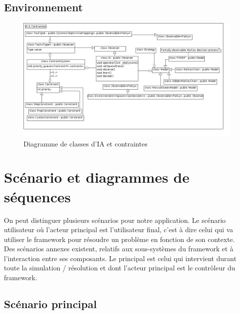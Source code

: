 \newpage
\subsection{Environnement}
\begin{figure}[!h]\centering
   \includegraphics[angle=90, scale=0.5]{images/c_ia_contraintes.png}
   \caption{\label{c_ia_contraintes} Diagramme de classes d'IA et contraintes}
\end{figure}

%
\newpage
\section{Scénario et diagrammes de séquences}

On peut distinguer plusieurs scénarios pour notre application. Le scénario utilisateur où l'acteur principal est l'utilisateur final, c'est à dire celui qui va utiliser le framework pour résoudre un problème en fonction de son contexte.\\

Des scénarios annexes existent, relatifs aux sous-systèmes du framework et à l’interaction entre ses composants. Le principal est celui qui intervient durant toute la simulation / résolution et dont l'acteur principal est le contrôleur du framework.

\subsection{Scénario principal}

